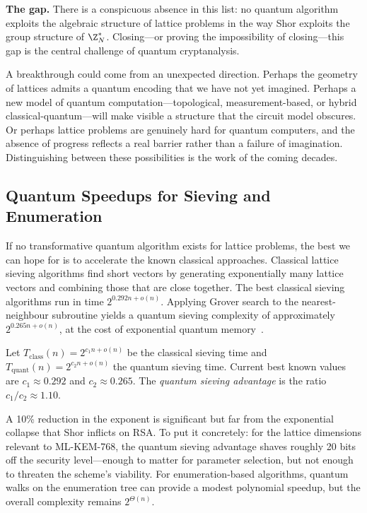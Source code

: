 \begin{svgraybox}
\textbf{The gap.}
There is a conspicuous absence in this list: no quantum algorithm exploits the algebraic structure of lattice problems in the way Shor exploits the group structure of $\Z_N^*$.  Closing---or proving the impossibility of closing---this gap is the central challenge of quantum cryptanalysis.
\end{svgraybox}

A breakthrough could come from an unexpected direction.  Perhaps the geometry of lattices admits a quantum encoding that we have not yet imagined.  Perhaps a new model of quantum computation---topological, measurement-based, or hybrid classical-quantum---will make visible a structure that the circuit model obscures.  Or perhaps lattice problems are genuinely hard for quantum computers, and the absence of progress reflects a real barrier rather than a failure of imagination.  Distinguishing between these possibilities is the work of the coming decades.

\subsection{Quantum Speedups for Sieving and Enumeration}
\label{subsec:quantum-sieving}

If no transformative quantum algorithm exists for lattice problems, the best we can hope for is to accelerate the known classical approaches.  Classical lattice sieving algorithms find short vectors by generating exponentially many lattice vectors and combining those that are close together.  The best classical sieving algorithms run in time $2^{0.292n + o(n)}$.  Applying Grover search to the nearest-neighbour subroutine yields a quantum sieving complexity of approximately $2^{0.265n + o(n)}$, at the cost of exponential quantum memory~\cite{Laarhoven2015}.

\begin{definition}
\label{def:quantum-sieving}
Let $T_{\mathrm{class}}(n) = 2^{c_1 n + o(n)}$ be the classical sieving time and $T_{\mathrm{quant}}(n) = 2^{c_2 n + o(n)}$ the quantum sieving time.  Current best known values are $c_1 \approx 0.292$ and $c_2 \approx 0.265$.  The \emph{quantum sieving advantage} is the ratio $c_1 / c_2 \approx 1.10$.
\end{definition}

A 10\% reduction in the exponent is significant but far from the exponential collapse that Shor inflicts on RSA.  To put it concretely: for the lattice dimensions relevant to ML-KEM-768, the quantum sieving advantage shaves roughly 20 bits off the security level---enough to matter for parameter selection, but not enough to threaten the scheme's viability.  For enumeration-based algorithms, quantum walks on the enumeration tree can provide a modest polynomial speedup, but the overall complexity remains $2^{\Theta(n)}$.

